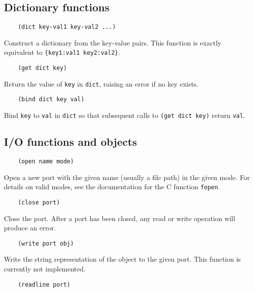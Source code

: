 \documentclass{article}
\newcommand{\inlinecode}{\texttt}
\begin{document}
\subsection{Dictionary functions}
\begin{verbatim}
    (dict key-val1 key-val2 ...)
\end{verbatim}

Construct a dictionary from the key-value pairs. This function is exactly equivalent to \inlinecode{\{key1:val1 key2:val2\}}.

\begin{verbatim}
    (get dict key)
\end{verbatim}

Return the value of \inlinecode{key} in \inlinecode{dict}, raising an error if no key exists.

\begin{verbatim}
    (bind dict key val)
\end{verbatim}

Bind \inlinecode{key} to \inlinecode{val} in \inlinecode{dict} so that subsequent calls to \inlinecode{(get dict key)} return \inlinecode{val}.

\subsection{I/O functions and objects}
\begin{verbatim}
    (open name mode)
\end{verbatim}

Open a new port with the given name (usually a file path) in the given mode. For details on valid modes, see the documentation for the C function \inlinecode{fopen}.

\begin{verbatim}
    (close port)
\end{verbatim}

Close the port. After a port has been closed, any read or write operation will produce an error.

\begin{verbatim}
    (write port obj)
\end{verbatim}

Write the string representation of the object to the given port. This function is currently not implemented.

\begin{verbatim}
    (readline port)
\end{verbatim}
\end{document}
